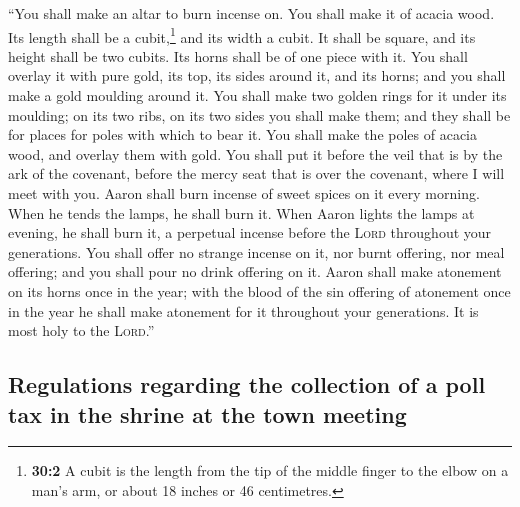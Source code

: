  ``You shall make an altar to burn incense on. You shall
make it of acacia wood.  Its length shall be a
cubit,\footnote{\textbf{30:2} A cubit is the length from the tip of the
  middle finger to the elbow on a man's arm, or about 18 inches or 46
  centimetres.} and its width a cubit. It shall be square, and its
height shall be two cubits. Its horns shall be of one piece with it.
 You shall overlay it with pure gold, its top, its sides
around it, and its horns; and you shall make a gold moulding around it.
 You shall make two golden rings for it under its
moulding; on its two ribs, on its two sides you shall make them; and
they shall be for places for poles with which to bear it. 
You shall make the poles of acacia wood, and overlay them with gold.
 You shall put it before the veil that is by the ark of
the covenant, before the mercy seat that is over the covenant, where I
will meet with you.  Aaron shall burn incense of sweet
spices on it every morning. When he tends the lamps, he shall burn it.
 When Aaron lights the lamps at evening, he shall burn it,
a perpetual incense before the \textsc{Lord} throughout your
generations.  You shall offer no strange incense on it,
nor burnt offering, nor meal offering; and you shall pour no drink
offering on it.  Aaron shall make atonement on its horns
once in the year; with the blood of the sin offering of atonement once
in the year he shall make atonement for it throughout your generations.
It is most holy to the \textsc{Lord}.''

\hypertarget{regulations-regarding-the-collection-of-a-poll-tax-in-the-shrine-at-the-town-meeting}{%
\subsection{Regulations regarding the collection of a poll tax in the
shrine at the town
meeting}\label{regulations-regarding-the-collection-of-a-poll-tax-in-the-shrine-at-the-town-meeting}}

